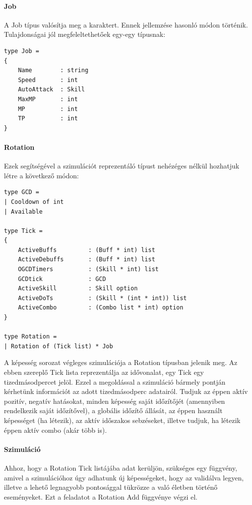 \documentclass[12pt]{article}
\begin{document}
\pagebreak
\paragraph{Job}
A Job típus valósítja meg a karaktert. Ennek jellemzése hasonló módon történik. Tulajdonságai jól megfeleltethetőek egy-egy típusnak:

\begin{lstlisting}
type Job =
{
	Name        : string
	Speed       : int
	AutoAttack  : Skill
	MaxMP       : int
	MP          : int
	TP          : int
}
\end{lstlisting}

\paragraph{Rotation}

Ezek segítségével a szimulációt reprezentáló típust nehézéges nélkül hozhatjuk létre a következő módon:

\begin{lstlisting}
type GCD =
| Cooldown of int
| Available

type Tick =
{
	ActiveBuffs         : (Buff * int) list
	ActiveDebuffs       : (Buff * int) list
	OGCDTimers          : (Skill * int) list
	GCDtick             : GCD
	ActiveSkill         : Skill option
	ActiveDoTs          : (Skill * (int * int)) list
	ActiveCombo         : (Combo list * int) option
}

type Rotation = 
| Rotation of (Tick list) * Job
\end{lstlisting}

\pagebreak

A képesség sorozat végleges szimulációja a Rotation típusban jelenik meg. Az ebben szereplő Tick lista reprezentálja az idővonalat, egy Tick egy tizedmásodpercet jelöl.
Ezzel a megoldással a szimuláció bármely pontján kérhetünk információt az adott tizedmásodperc adatairól. 
Tudjuk az éppen aktív pozitív, negatív hatásokat, minden képesség saját időzítőjét (amennyiben rendelkezik saját időzítővel), 
a globális időzítő állását, az éppen használt képességet (ha létezik), az aktív időszakos sebzéseket, illetve tudjuk, ha létezik éppen aktív combo (akár több is).

\paragraph{Szimuláció}

Ahhoz, hogy a Rotation Tick listájába adat kerüljön, szükséges egy függvény, amivel a szimulációhoz úgy adhatunk új képességeket, hogy az validálva legyen, illetve a lehető legnagyobb pontosággal tükrözze a való életben történő eseményeket.
Ezt a feladatot a Rotation Add függvénye végzi el. 
\end{document}

